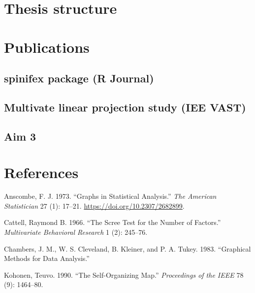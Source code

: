 \documentclass[11,]{article}
\begin{document}
\hypertarget{thesis-structure}{%
\section{Thesis structure}\label{thesis-structure}}

\hypertarget{publications}{%
\section{Publications}\label{publications}}

\hypertarget{spinifex-package-r-journal}{%
\subsection{spinifex package (R Journal)}\label{spinifex-package-r-journal}}

\hypertarget{multivate-linear-projection-study-iee-vast}{%
\subsection{Multivate linear projection study (IEE VAST)}\label{multivate-linear-projection-study-iee-vast}}

\hypertarget{aim-3}{%
\subsection{Aim 3}\label{aim-3}}

\hypertarget{references}{%
\section*{References}\label{references}}

\hypertarget{refs}{}
\leavevmode\hypertarget{ref-anscombe_graphs_1973}{}%
Anscombe, F. J. 1973. ``Graphs in Statistical Analysis.'' \emph{The American Statistician} 27 (1): 17--21. \url{https://doi.org/10.2307/2682899}.

\leavevmode\hypertarget{ref-cattell_scree_1966}{}%
Cattell, Raymond B. 1966. ``The Scree Test for the Number of Factors.'' \emph{Multivariate Behavioral Research} 1 (2): 245--76.

\leavevmode\hypertarget{ref-chambers_graphical_1983}{}%
Chambers, J. M., W. S. Cleveland, B. Kleiner, and P. A. Tukey. 1983. ``Graphical Methods for Data Analysis.''

\leavevmode\hypertarget{ref-kohonen_self-organizing_1990}{}%
Kohonen, Teuvo. 1990. ``The Self-Organizing Map.'' \emph{Proceedings of the IEEE} 78 (9): 1464--80.
\end{document}

